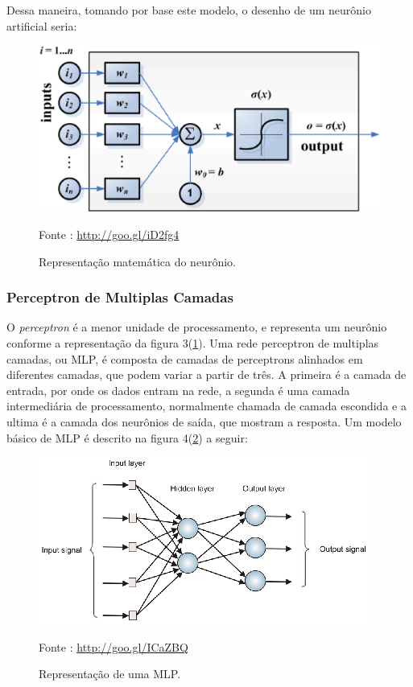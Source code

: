     Dessa maneira, tomando por base este modelo, o desenho de um neurônio artificial seria:

    \begin{figure}[ht]
        \centering
        \label{fig03}
            \includegraphics[keepaspectratio=true, scale=0.27]{editaveis/images/modeloNeuronio.eps}
        \caption{Representação matemática do neurônio.}
        Fonte : \url{http://goo.gl/iD2fg4}
    \end{figure}
    \newpage

\subsubsection{Perceptron de Multiplas Camadas}
    O \textit{perceptron} é a menor unidade de processamento, e representa um neurônio conforme a representação da figura 3(\ref{fig03}). Uma rede perceptron de multiplas camadas, ou MLP, é composta de camadas de perceptrons alinhados em diferentes camadas, que podem variar a partir de três. A primeira é a camada de entrada, por onde os dados entram na rede, a segunda é uma camada intermediária de processamento, normalmente chamada de camada escondida e a ultima é a camada dos neurônios de saída, que mostram a resposta. Um modelo básico de MLP é descrito na figura 4(\ref{fig04}) a seguir:

    \begin{figure}[ht]
        \centering
        \label{fig04}
            \includegraphics[keepaspectratio=true, scale=2.1]{editaveis/images/mlp.eps}
        \caption{Representação de uma MLP.}
        Fonte : \url{http://goo.gl/ICaZBQ}
    \end{figure}


